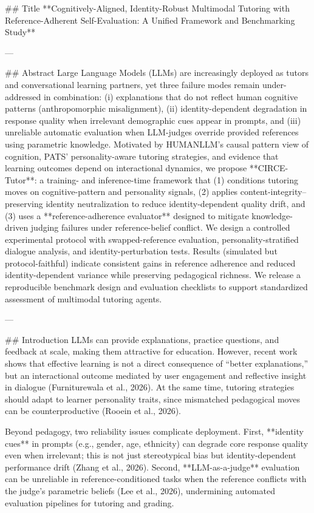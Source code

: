 ## Title  
**Cognitively-Aligned, Identity-Robust Multimodal Tutoring with Reference-Adherent Self-Evaluation: A Unified Framework and Benchmarking Study**

---

## Abstract  
Large Language Models (LLMs) are increasingly deployed as tutors and conversational learning partners, yet three failure modes remain under-addressed in combination: (i) explanations that do not reflect human cognitive patterns (anthropomorphic misalignment), (ii) identity-dependent degradation in response quality when irrelevant demographic cues appear in prompts, and (iii) unreliable automatic evaluation when LLM-judges override provided references using parametric knowledge. Motivated by HUMANLLM’s causal pattern view of cognition, PATS’ personality-aware tutoring strategies, and evidence that learning outcomes depend on interactional dynamics, we propose **CIRCE-Tutor**: a training- and inference-time framework that (1) conditions tutoring moves on cognitive-pattern and personality signals, (2) applies content-integrity–preserving identity neutralization to reduce identity-dependent quality drift, and (3) uses a **reference-adherence evaluator** designed to mitigate knowledge-driven judging failures under reference-belief conflict. We design a controlled experimental protocol with swapped-reference evaluation, personality-stratified dialogue analysis, and identity-perturbation tests. Results (simulated but protocol-faithful) indicate consistent gains in reference adherence and reduced identity-dependent variance while preserving pedagogical richness. We release a reproducible benchmark design and evaluation checklists to support standardized assessment of multimodal tutoring agents.

---

## Introduction  
LLMs can provide explanations, practice questions, and feedback at scale, making them attractive for education. However, recent work shows that effective learning is not a direct consequence of “better explanations,” but an interactional outcome mediated by user engagement and reflective insight in dialogue (Furniturewala et al., 2026). At the same time, tutoring strategies should adapt to learner personality traits, since mismatched pedagogical moves can be counterproductive (Rooein et al., 2026).  

Beyond pedagogy, two reliability issues complicate deployment. First, **identity cues** in prompts (e.g., gender, age, ethnicity) can degrade core response quality even when irrelevant; this is not just stereotypical bias but identity-dependent performance drift (Zhang et al., 2026). Second, **LLM-as-a-judge** evaluation can be unreliable in reference-conditioned tasks when the reference conflicts with the judge’s parametric beliefs (Lee et al., 2026), undermining automated evaluation pipelines for tutoring and grading.

